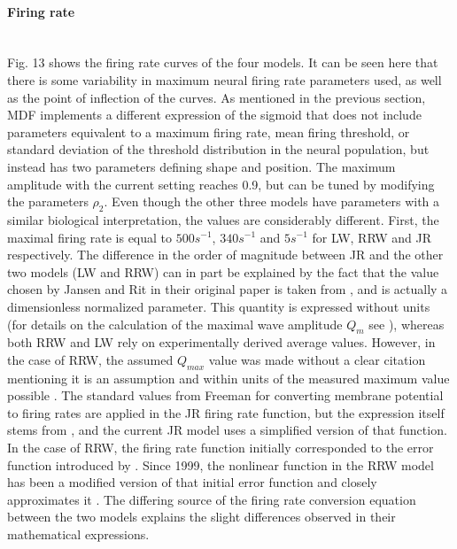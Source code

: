 \documentclass[12pt,twoside]{article}
\begin{document}
\paragraph{Firing rate} ~\\
Fig. 13 shows the firing rate curves of the four models. It can be seen here that there is some variability in maximum neural firing rate parameters used, as well as the point of inflection of the curves. As mentioned in the previous section, MDF implements a different expression of the sigmoid that does not include parameters equivalent to a maximum firing rate, mean firing threshold, or standard deviation of the threshold distribution in the neural population, but instead has two parameters defining shape and position. The maximum amplitude with the current setting reaches 0.9, but can be tuned by modifying the parameters $\rho_2$. Even though the other three models have parameters with a similar biological interpretation, the values are considerably different. First, the maximal firing rate is equal to $500s^{-1}$, $340s^{-1}$ and $5s^{-1}$ for LW, RRW and JR respectively. The difference in the order of magnitude between JR and the other two models (LW and RRW) can in part be explained by the fact that the value chosen by Jansen and Rit in their original paper is taken from \citet{freeman1987simulation}, and is actually a dimensionless normalized parameter. This quantity is expressed without units (for details on the calculation of the maximal wave amplitude $Q_{m}$ see \citealp{freeman1979nonlinear}), whereas both RRW and LW rely on experimentally derived average values. However, in the case of RRW, the assumed $Q_{max}$ value was made without a clear citation mentioning it is an assumption and within units of the measured maximum value possible \citep{robinson1997propagation, rennie1999effects}. The standard values from Freeman for converting membrane potential to firing rates are applied in the JR firing rate function, but the expression itself stems from \citet{da1976models}, and the current JR model uses a simplified version of that function. In the case of RRW, the firing rate function initially corresponded to the error function introduced by \citet{wright1995simulation}. Since 1999, the nonlinear function in the RRW model has been a modified version of that initial error function and closely approximates it \citep{rennie1999effects}. The differing source of the firing rate conversion equation between the two models explains the slight differences observed in their mathematical expressions. 
\end{document}
